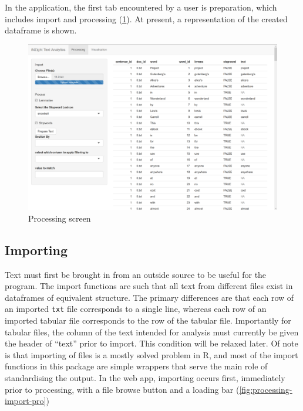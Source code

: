 \documentclass[11pt, a4paper, titlepage]{report}
\begin{document}
In the application, the first tab encountered by a user is
preparation, which includes import and processing
(\underline{\cref{fig:processing-overview}}). At present, a
representation of the created dataframe is shown.

\begin{figure}
  \centering \includegraphics[scale=0.35]{processing-overview.png}
  \caption{Processing screen\label{fig:processing-overview}}
\end{figure}

\subsection{Importing}\label{sec:importing}

Text must first be brought in from an outside source to be useful for
the program. The import functions are such that all text from
different files exist in dataframes of equivalent structure. The
primary differences are that each row of an imported \texttt{txt} file
corresponds to a single line, whereas each row of an imported tabular
file corresponds to the row of the tabular file. Importantly for
tabular files, the column of the text intended for analysis must
currently be given the header of ``text'' prior to import. This
condition will be relaxed later. Of note is that importing of files is
a mostly solved problem in R, and most of the import functions in this
package are simple wrappers that serve the main role of standardising
the output. In the web app, importing occurs first, immediately prior
to processing, with a file browse button and a loading bar
(\underline{\cref{fig:processing-import-pro}})
\end{document}
